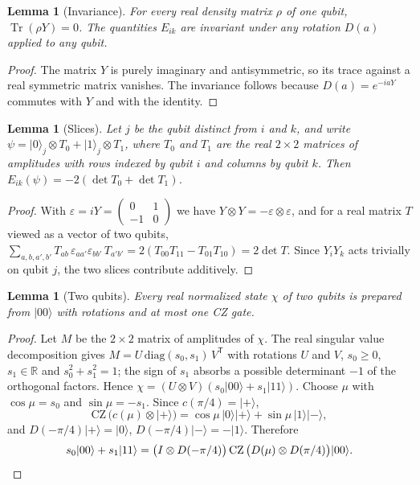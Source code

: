 \documentclass[11pt,a4paper]{article}
\newtheorem{lemma}[theorem]{Lemma}
\theoremstyle{definition}
\theoremstyle{plain}
\DeclareMathOperator{\Tr}{Tr}
\newcommand{\ket}[1]{\lvert#1\rangle}
\newcommand{\R}{\mathbb{R}}
\newcommand{\T}{\mathsf{T}}
\newcommand{\CZ}{\mathrm{CZ}}
\begin{document}
\begin{lemma}[Invariance]\label{lem:inv}
For every real density matrix $\rho$ of one qubit, $\Tr(\rho Y)=0$. The
quantities $E_{ik}$ are invariant under any rotation $D(a)$ applied to any
qubit.
\end{lemma}

\begin{proof}
The matrix $Y$ is purely imaginary and antisymmetric, so its trace against a
real symmetric matrix vanishes. The invariance follows because
$D(a)=e^{-iaY}$ commutes with $Y$ and with the identity.
\end{proof}

\begin{lemma}[Slices]\label{lem:slices}
Let $j$ be the qubit distinct from $i$ and $k$, and write
$\psi=\ket0_j\otimes T_0+\ket1_j\otimes T_1$, where $T_0$ and $T_1$ are the
real $2\times2$ matrices of amplitudes with rows indexed by qubit $i$ and
columns by qubit $k$. Then $E_{ik}(\psi)=-2(\det T_0+\det T_1)$.
\end{lemma}

\begin{proof}
With $\varepsilon=iY=\left(\begin{smallmatrix}0&1\\-1&0\end{smallmatrix}\right)$
we have $Y\otimes Y=-\varepsilon\otimes\varepsilon$, and for a real matrix $T$
viewed as a vector of two qubits,
$\sum_{a,b,a',b'}T_{ab}\,\varepsilon_{aa'}\varepsilon_{bb'}\,T_{a'b'}
=2(T_{00}T_{11}-T_{01}T_{10})=2\det T$. Since $Y_iY_k$ acts trivially on
qubit $j$, the two slices contribute additively.
\end{proof}

\begin{lemma}[Two qubits]\label{lem:twoqubits}
Every real normalized state $\chi$ of two qubits is prepared from $\ket{00}$
with rotations and at most one CZ gate.
\end{lemma}

\begin{proof}
Let $M$ be the $2\times2$ matrix of amplitudes of $\chi$. The real singular
value decomposition gives $M=U\,\mathrm{diag}(s_0,s_1)\,V^\T$ with rotations $U$
and $V$, $s_0\ge0$, $s_1\in\R$ and $s_0^2+s_1^2=1$; the sign of $s_1$ absorbs
a possible determinant $-1$ of the orthogonal factors. Hence
$\chi=(U\otimes V)(s_0\ket{00}+s_1\ket{11})$. Choose $\mu$ with
$\cos\mu=s_0$ and $\sin\mu=-s_1$. Since $c(\pi/4)=\ket+$,
\[
\CZ\,\bigl(c(\mu)\otimes\ket+\bigr)=\cos\mu\,\ket0\ket+ +\sin\mu\,\ket1\ket-,
\]
and $D(-\pi/4)\ket+=\ket0$, $D(-\pi/4)\ket-=-\ket1$. Therefore
\[
s_0\ket{00}+s_1\ket{11}=\bigl(I\otimes D(-\pi/4)\bigr)\,\CZ\,\bigl(D(\mu)\otimes D(\pi/4)\bigr)\ket{00}. \qedhere
\]
\end{proof}
\end{document}
